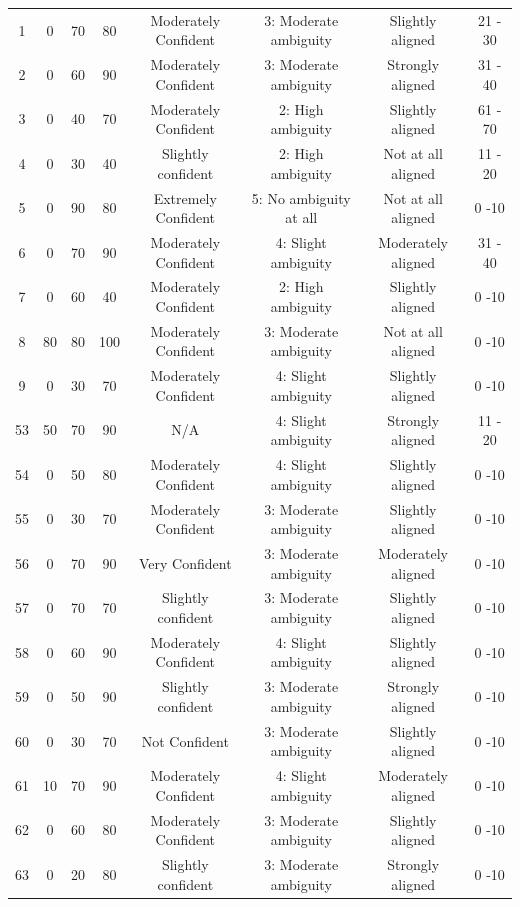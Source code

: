 \documentclass[11pt]{article}
\begin{document}
\begin{landscape}
{\begin{longtable}{cccccccc}
1 & 0 & 70 & 80 & Moderately Confident & 3: Moderate ambiguity & Slightly aligned & 21 - 30 \\
2 & 0 & 60 & 90 & Moderately Confident & 3: Moderate ambiguity & Strongly aligned & 31 - 40 \\
3 & 0 & 40 & 70 & Moderately Confident & 2: High ambiguity & Slightly aligned & 61 - 70 \\
4 & 0 & 30 & 40 & Slightly confident & 2: High ambiguity & Not at all aligned & 11 - 20 \\
5 & 0 & 90 & 80 & Extremely Confident & 5: No ambiguity at all & Not at all aligned & 0 -10 \\
6 & 0 & 70 & 90 & Moderately Confident & 4: Slight ambiguity & Moderately aligned & 31 - 40 \\
7 & 0 & 60 & 40 & Moderately Confident & 2: High ambiguity & Slightly aligned & 0 -10 \\
8 & 80 & 80 & 100 & Moderately Confident & 3: Moderate ambiguity & Not at all aligned & 0 -10 \\
9 & 0 & 30 & 70 & Moderately Confident & 4: Slight ambiguity & Slightly aligned & 0 -10 \\
53 & 50 & 70 & 90 & N/A & 4: Slight ambiguity & Strongly aligned & 11 - 20 \\
54 & 0 & 50 & 80 & Moderately Confident & 4: Slight ambiguity & Slightly aligned & 0 -10 \\
55 & 0 & 30 & 70 & Moderately Confident & 3: Moderate ambiguity & Slightly aligned & 0 -10 \\
56 & 0 & 70 & 90 & Very Confident & 3: Moderate ambiguity & Moderately aligned & 0 -10 \\
57 & 0 & 70 & 70 & Slightly confident & 3: Moderate ambiguity & Slightly aligned & 0 -10 \\
58 & 0 & 60 & 90 & Moderately Confident & 4: Slight ambiguity & Slightly aligned & 0 -10 \\
59 & 0 & 50 & 90 & Slightly confident & 3: Moderate ambiguity & Strongly aligned & 0 -10 \\
60 & 0 & 30 & 70 & Not Confident & 3: Moderate ambiguity & Slightly aligned & 0 -10 \\
61 & 10 & 70 & 90 & Moderately Confident & 4: Slight ambiguity & Moderately aligned & 0 -10 \\
62 & 0 & 60 & 80 & Moderately Confident & 3: Moderate ambiguity & Slightly aligned & 0 -10 \\
63 & 0 & 20 & 80 & Slightly confident & 3: Moderate ambiguity & Strongly aligned & 0 -10 \\

\end{longtable}}
\end{landscape}
\end{document}
